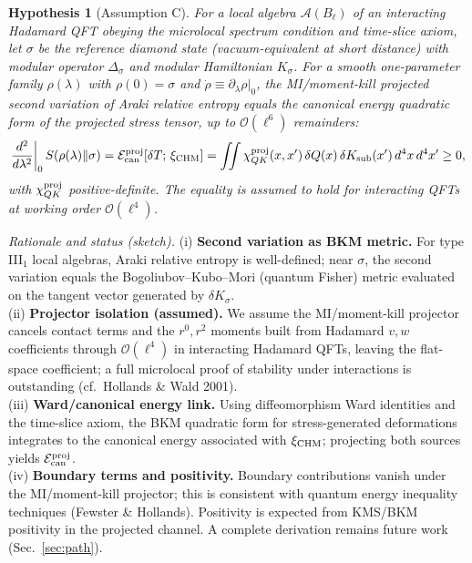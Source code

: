 \documentclass[aps,prd,onecolumn,superscriptaddress,nofootinbib]{revtex4-2}
\providecommand{\be}{\begin{equation}}
\providecommand{\ee}{\end{equation}}
\newtheorem{hypothesis}{Hypothesis}
\begin{document}
\begin{hypothesis}[Assumption C]
For a local algebra \(\mathcal A(B_\ell)\) of an interacting Hadamard QFT obeying the microlocal spectrum condition and time-slice axiom, let \(\sigma\) be the reference diamond state (vacuum-equivalent at short distance) with modular operator \(\Delta_\sigma\) and modular Hamiltonian \(K_\sigma\). For a smooth one-parameter family \(\rho(\lambda)\) with \(\rho(0)=\sigma\) and \(\dot\rho\equiv \partial_\lambda\rho|_0\), the MI/moment-kill projected second variation of Araki relative entropy equals the canonical energy quadratic form of the projected stress tensor, up to \(\mathcal O(\ell^6)\) remainders:
\be
\left.\frac{d^2}{d\lambda^2}\right|_0 S(\rho(\lambda)\Vert\sigma)
=\mathcal E_{\rm can}^{\rm proj}[\delta T;\,\xi_{\rm CHM}]
=\iint \chi_{QK}^{\rm proj}(x,x')\,\delta Q(x)\,\delta K_{\rm sub}(x')\,d^4x\,d^4x' \ge 0,
\ee
with \(\chi_{QK}^{\rm proj}\) positive-definite. The equality is \emph{assumed} to hold for interacting QFTs at working order \(\mathcal O(\ell^4)\).
\end{hypothesis}

\noindent\emph{Rationale and status (sketch).}
(i) \textbf{Second variation as BKM metric.} For type III\(_1\) local algebras, Araki relative entropy is well-defined; near \(\sigma\), the second variation equals the Bogoliubov--Kubo--Mori (quantum Fisher) metric evaluated on the tangent vector generated by \(\delta K_\sigma\).\\
(ii) \textbf{Projector isolation (assumed).} We assume the MI/moment-kill projector cancels contact terms and the \(r^0,r^2\) moments built from Hadamard \(v,w\) coefficients through \(\mathcal O(\ell^4)\) in interacting Hadamard QFTs, leaving the flat-space coefficient; a full microlocal proof of stability under interactions is outstanding (cf.\ Hollands \& Wald 2001).\\
(iii) \textbf{Ward/canonical energy link.} Using diffeomorphism Ward identities and the time-slice axiom, the BKM quadratic form for stress-generated deformations integrates to the canonical energy associated with \(\xi_{\rm CHM}\); projecting both sources yields \(\mathcal E_{\rm can}^{\rm proj}\).\\
(iv) \textbf{Boundary terms and positivity.} Boundary contributions vanish under the MI/moment-kill projector; this is consistent with quantum energy inequality techniques (Fewster \& Hollands). Positivity is expected from KMS/BKM positivity in the projected channel. A complete derivation remains future work (Sec.~\ref{sec:path}).
\end{document}
